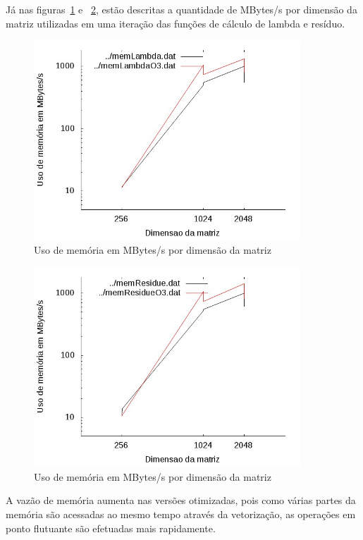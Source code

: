 \documentclass[12pt]{article}
\begin{document}
\clearpage

Já nas figuras~\ref{fig:memLambda} e ~\ref{fig:memResidue}, estão descritas
a quantidade de MBytes/s por dimensão da matriz utilizadas em uma iteração das
funções de cálculo de lambda e resíduo.

\begin{figure}[htb] \begin{center}
\includegraphics[width=100mm]{img/memLambda.jpg} \end{center}
\caption{Uso de memória em MBytes/s por dimensão da matriz}\label{fig:memLambda}
\end{figure}

\begin{figure}[htb] \begin{center}
\includegraphics[width=100mm]{img/memResidue.jpg} \end{center}
\caption{Uso de memória em MBytes/s por dimensão da matriz}\label{fig:memResidue}
\end{figure}

A vazão de memória aumenta nas versões otimizadas, pois como várias partes da
memória são acessadas ao mesmo tempo através da vetorização, as operações em
ponto flutuante são efetuadas mais rapidamente.
\end{document}
